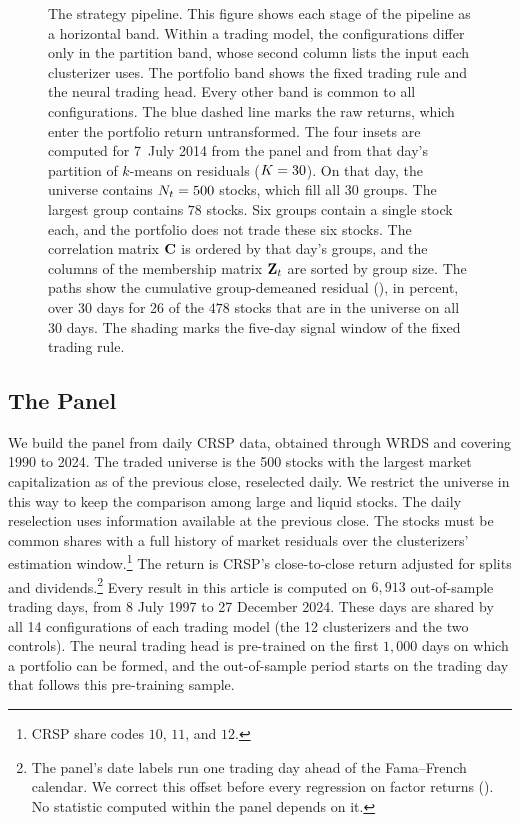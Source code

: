 \begin{figure}[p]
\centering
\resizebox{\textwidth}{!}{}
\caption{The strategy pipeline. This figure shows each stage of the pipeline as a horizontal band. Within a trading model, the configurations differ only in the partition band, whose second column lists the input each clusterizer uses. The portfolio band shows the fixed trading rule and the neural trading head. Every other band is common to all configurations. The blue dashed line marks the raw returns, which enter the portfolio return untransformed. The four insets are computed for 7~July 2014 from the panel and from that day's partition of $k$-means on residuals ($K=30$). On that day, the universe contains $N_t = 500$ stocks, which fill all 30 groups. The largest group contains $78$ stocks. Six groups contain a single stock each, and the portfolio does not trade these six stocks. The correlation matrix $\mathbf{C}$ is ordered by that day's groups, and the columns of the membership matrix $\mathbf{Z}_t$ are sorted by group size. The paths show the cumulative group-demeaned residual (), in percent, over 30 days for 26 of the $478$ stocks that are in the universe on all 30 days. The shading marks the five-day signal window of the fixed trading rule.}
\label{fig:pipeline}
\end{figure}

\subsection{The Panel}
\label{sec:panel}

We build the panel from daily CRSP data, obtained through WRDS and covering
1990 to 2024. The traded universe is the 500 stocks
with the largest market capitalization as of the previous close,
reselected daily. We restrict the universe in this way to keep the comparison among large and liquid stocks. The daily reselection uses information available at the previous close. The stocks must be common shares with a full history of market residuals over the clusterizers' estimation window.\footnote{CRSP share codes $10$, $11$, and $12$.} The return is CRSP's close-to-close return adjusted for splits and dividends.\footnote{The panel's date labels run one trading day ahead of the Fama--French calendar. We correct this offset before every regression on factor returns (). No statistic computed within the panel depends on it.} Every result in this article is computed on $6{,}913$ out-of-sample trading days, from 8 July 1997 to 27 December 2024. These days are shared by all 14 configurations of each trading model (the 12 clusterizers and the two controls). The neural trading head is pre-trained on the first $1{,}000$ days on which a portfolio can be
formed, and the out-of-sample period starts on the trading day that follows this pre-training sample.

